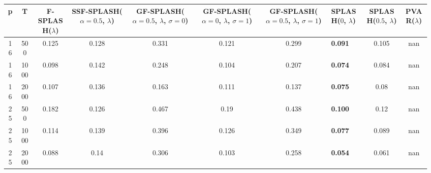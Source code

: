 \begin{tabular}{ccccccclcc}
\hline
  p  &  T   &  F-SPLASH($\lambda$)  &  SSF-SPLASH($\alpha=0.5$, $\lambda$)  &  GF-SPLASH($\alpha=0.5$, $\lambda$, $\sigma=0$)  &  GF-SPLASH($\alpha=0$, $\lambda$, $\sigma=1$)  &  GF-SPLASH($\alpha=0.5$, $\lambda$, $\sigma=1$)  & SPLASH($0$, $\lambda$)   &  SPLASH($0.5$, $\lambda$)  &  PVAR($\lambda$)  \\
\hline
 16  & 500  &         0.125         &                 0.128                 &                      0.331                       &                     0.121                      &                      0.299                       & \textbf{0.091}           &           0.105            &        nan        \\
 16  & 1000 &         0.098         &                 0.142                 &                      0.248                       &                     0.104                      &                      0.207                       & \textbf{0.074}           &           0.084            &        nan        \\
 16  & 2000 &         0.107         &                 0.136                 &                      0.163                       &                     0.111                      &                      0.137                       & \textbf{0.075}           &            0.08            &        nan        \\
 25  & 500  &         0.182         &                 0.126                 &                      0.467                       &                      0.19                      &                      0.438                       & \textbf{0.100}           &            0.12            &        nan        \\
 25  & 1000 &         0.114         &                 0.139                 &                      0.396                       &                     0.126                      &                      0.349                       & \textbf{0.077}           &           0.089            &        nan        \\
 25  & 2000 &         0.088         &                 0.14                  &                      0.306                       &                     0.103                      &                      0.258                       & \textbf{0.054}           &           0.061            &        nan        \\
\hline
\end{tabular}